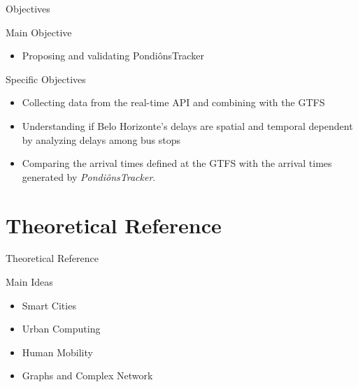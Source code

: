 \documentclass[xcolor=dvipsnames,table]{beamer}
\begin{document}
\begin{frame}{Objectives}
        \begin{block}{Main Objective}
                \begin{itemize}
                        \item Proposing and validating PondiônsTracker
                \end{itemize}
        \end{block}
        \begin{block}{Specific Objectives}
                \begin{itemize}
                        \item Collecting data from the real-time API and combining with the GTFS
                        \item Understanding if Belo Horizonte's delays are spatial and temporal dependent by analyzing delays among bus stops
                        \item Comparing the arrival times defined at the GTFS with the arrival times generated by \textit{PondiônsTracker}.
                \end{itemize}
        \end{block}
\end{frame}


\section{Theoretical Reference}
\begin{frame}{Theoretical Reference}
        \begin{block}{Main Ideas}
                \begin{itemize}
                        \item Smart Cities
                        \item Urban Computing
                        \item Human Mobility
                        \item Graphs and Complex Network
                \end{itemize}
        \end{block}
\end{frame}
\end{document}
